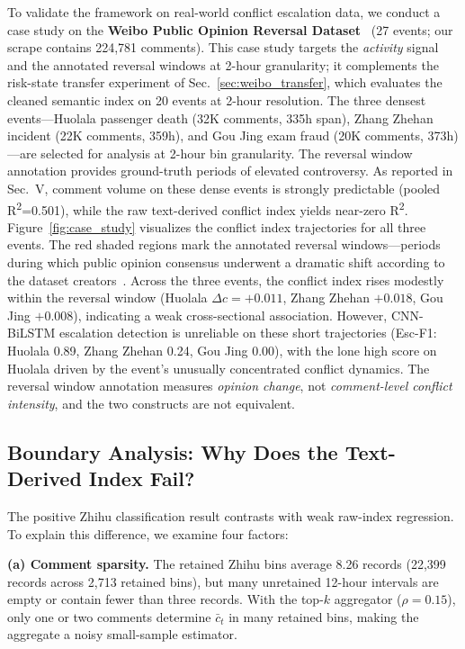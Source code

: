 \documentclass[journal]{IEEEtran}
\begin{document}
To validate the framework on real-world conflict escalation data, we conduct a case study on the \textbf{Weibo Public Opinion Reversal Dataset}~\cite{Zhang2023Reversal} (27 events; our scrape contains 224,781 comments). This case study targets the \emph{activity} signal and the annotated reversal windows at 2-hour granularity; it complements the risk-state transfer experiment of Sec.~\ref{sec:weibo_transfer}, which evaluates the cleaned semantic index on 20 events at 2-hour resolution. The three densest events---Huolala passenger death (32K comments, 335h span), Zhang Zhehan incident (22K comments, 359h), and Gou Jing exam fraud (20K comments, 373h)---are selected for analysis at 2-hour bin granularity. The reversal window annotation provides ground-truth periods of elevated controversy. As reported in Sec.~V, comment volume on these dense events is strongly predictable (pooled R\textsuperscript{2}=0.501), while the raw text-derived conflict index yields near-zero R\textsuperscript{2}. Figure~\ref{fig:case_study} visualizes the conflict index trajectories for all three events. The red shaded regions mark the annotated reversal windows---periods during which public opinion consensus underwent a dramatic shift according to the dataset creators~\cite{Zhang2023Reversal}. Across the three events, the conflict index rises modestly within the reversal window (Huolala $\Delta c=+0.011$, Zhang Zhehan $+0.018$, Gou Jing $+0.008$), indicating a weak cross-sectional association. However, CNN-BiLSTM escalation detection is unreliable on these short trajectories (Esc-F1: Huolala 0.89, Zhang Zhehan 0.24, Gou Jing 0.00), with the lone high score on Huolala driven by the event's unusually concentrated conflict dynamics. The reversal window annotation measures \emph{opinion change}, not \emph{comment-level conflict intensity}, and the two constructs are not equivalent.

\subsection{Boundary Analysis: Why Does the Text-Derived Index Fail?}\label{sec:discussion}\label{sec:attribution}

The positive Zhihu classification result contrasts with weak raw-index regression. To explain this difference, we examine four factors:

\textbf{(a) Comment sparsity.} The retained Zhihu bins average 8.26 records (22,399 records across 2,713 retained bins), but many unretained 12-hour intervals are empty or contain fewer than three records. With the top-$k$ aggregator ($\rho{=}0.15$), only one or two comments determine $\bar{c}_t$ in many retained bins, making the aggregate a noisy small-sample estimator.
\end{document}
